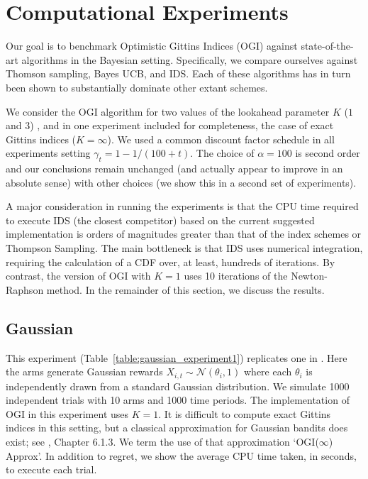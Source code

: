 \section{Computational Experiments} \label{sec:experiments}
Our goal is to benchmark Optimistic Gittins Indices (OGI) against state-of-the-art algorithms in the Bayesian setting. Specifically, we compare ourselves against Thomson sampling, Bayes UCB, and IDS. Each of these algorithms has in turn been shown to substantially dominate other extant schemes. 

We consider the OGI algorithm for two values of the lookahead parameter $K$ ($1$ and $3$) , and in one experiment included for completeness, the case of exact Gittins indices ($K=\infty$). We used a common discount factor schedule in all experiments setting $\gamma_t = 1 - 1/(100 + t)$. The choice of $\alpha = 100$ is second order and our conclusions remain unchanged (and actually appear to improve in an absolute sense) with other choices (we show this in a second set of experiments). 

A major consideration in running the experiments is that the CPU time required to execute IDS (the closest competitor) based on the current suggested implementation is orders of magnitudes greater than that of the index schemes or Thompson Sampling. The main bottleneck is that IDS uses numerical integration,  requiring the calculation of a CDF over, at least, hundreds of iterations. By contrast, the version of OGI with $K=1$ uses 10 iterations of the Newton-Raphson method. In the remainder of this section, we discuss the results.

\subsection{Gaussian}
This experiment (Table~\ref{table:gaussian_experiment1}) replicates one in \cite{russo2014learning}. Here the arms generate Gaussian rewards  $X_{i,t} \sim \mathcal{N}(\theta_i, 1)$ where each $\theta_i$ is independently drawn from a standard Gaussian distribution. We simulate 1000 independent trials with 10 arms and 1000 time periods. The implementation of OGI in this experiment uses $K = 1$. It is difficult to compute exact Gittins indices in this setting, but a classical approximation for Gaussian bandits does exist; see \cite{powell2012optimal}, Chapter 6.1.3. We term the use of that approximation `OGI($\infty$) Approx'.  In addition to regret, we  show the average CPU time taken, in seconds, to execute each trial.

